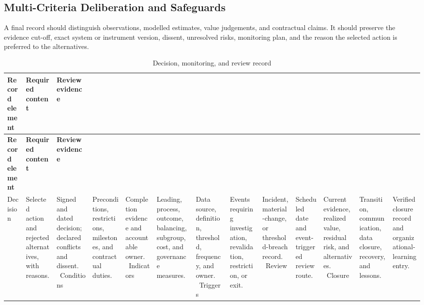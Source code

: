 \subsection{Multi-Criteria Deliberation and Safeguards}
\label{sec:comp-ch15-supp-3}
A final record should distinguish observations, modelled estimates, value
judgements, and contractual claims. It should preserve the evidence cut-off, exact
system or instrument version, dissent, unresolved risks, monitoring plan, and the
reason the selected action is preferred to the alternatives.

\begin{longtable}{@{}p{}p{}p{}@{}}
\caption{Decision, monitoring, and review record}
\label{tab:comp-ch15-decision-record}\\
\toprule
\textbf{Record element} & \textbf{Required content} & \textbf{Review evidence} \\
\midrule
\endfirsthead
\toprule
\textbf{Record element} & \textbf{Required content} & \textbf{Review evidence} \\
\midrule
\endhead
\bottomrule
\endlastfoot
Decision & Selected action and rejected alternatives, with reasons. & Signed and dated decision; declared conflicts and dissent. \
Conditions & Preconditions, restrictions, milestones, and contractual duties. & Completion evidence and accountable owner. \
Indicators & Leading, process, outcome, balancing, subgroup, cost, and governance measures. & Data source, definition, threshold, frequency, and owner. \
Triggers & Events requiring investigation, revalidation, restriction, or exit. & Incident, material-change, or threshold-breach record. \
Review & Scheduled date and event-triggered review route. & Current evidence, realized value, residual risk, and alternatives. \
Closure & Transition, communication, data closure, recovery, and lessons. & Verified closure record and organizational-learning entry. \
\end{longtable}

